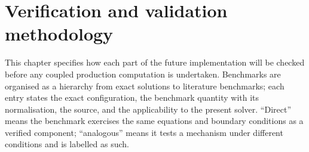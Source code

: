 \chapter{Verification and validation methodology}
\label{ch:validation}

This chapter specifies how each part of the future implementation will be checked before any
coupled production computation is undertaken. Benchmarks are organised as a hierarchy from exact
solutions to literature benchmarks; each entry states the exact configuration, the benchmark
quantity with its normalisation, the source, and the applicability to the present solver.
``Direct'' means the benchmark exercises the same equations and boundary conditions as a verified
component; ``analogous'' means it tests a mechanism under different conditions and is labelled as
such.

